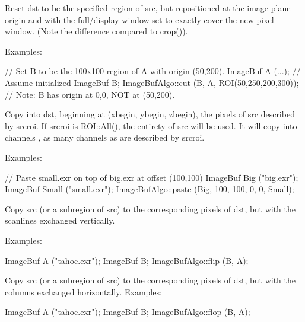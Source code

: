  
\NEW  %
Reset {\cf dst} to be the specified region of {\cf src}, but repositioned at
the image plane origin and with the full/display window set to exactly cover
the new pixel window.  (Note the difference compared to {\cf crop()}).

\smallskip
\noindent Examples:
\begin{code}
    // Set B to be the 100x100 region of A with origin (50,200).
    ImageBuf A (...);  // Assume initialized
    ImageBuf B;
    ImageBufAlgo::cut (B, A, ROI(50,250,200,300));
    // Note: B has origin at 0,0, NOT at (50,200).
\end{code}
\apiend


 
Copy into {\cf dst}, beginning at {\cf (xbegin, ybegin, zbegin)}, the pixels of
{\cf src} described by {\cf srcroi}.  If {\cf srcroi} is {\cf ROI::All()},
the entirety of src will be used.  It will copy into channels 
{\cf [chbegin...]}, as many channels as are described by {\cf srcroi}.

\smallskip
\noindent Examples:
\begin{code}
    // Paste small.exr on top of big.exr at offset (100,100)
    ImageBuf Big ("big.exr");
    ImageBuf Small ("small.exr");
    ImageBufAlgo::paste (Big, 100, 100, 0, 0, Small);
\end{code}
\apiend


 
Copy {\cf src} (or a subregion of {\cf src}) to the corresponding pixels
of {\cf dst}, but with the scanlines exchanged vertically.

\smallskip
\noindent Examples:
\begin{code}
    ImageBuf A ("tahoe.exr");
    ImageBuf B;
    ImageBufAlgo::flip (B, A);
\end{code}
\apiend


 
Copy {\cf src} (or a subregion of {\cf src}) to the corresponding pixels
of {\cf dst}, but with the columns exchanged horizontally.
\smallskip
\noindent Examples:
\begin{code}
    ImageBuf A ("tahoe.exr");
    ImageBuf B;
    ImageBufAlgo::flop (B, A);
\end{code}
\apiend


